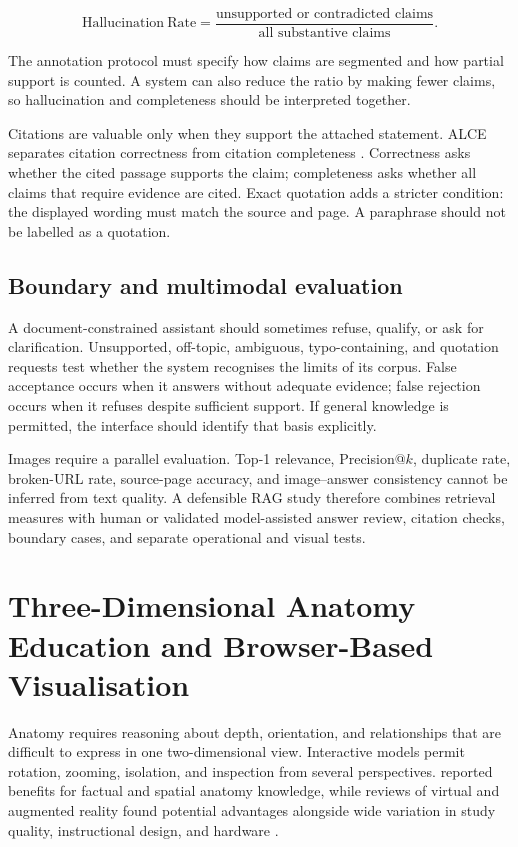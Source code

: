 \begin{equation}
\mathrm{Hallucination\ Rate}=
\frac{\text{unsupported or contradicted claims}}
{\text{all substantive claims}}.
\label{eq:hallucination-rate}
\end{equation}

The annotation protocol must specify how claims are segmented and how partial support is counted. A system can also reduce the ratio by making fewer claims, so hallucination and completeness should be interpreted together.

Citations are valuable only when they support the attached statement. ALCE separates citation correctness from citation completeness \parencite{gao2023alce}. Correctness asks whether the cited passage supports the claim; completeness asks whether all claims that require evidence are cited. Exact quotation adds a stricter condition: the displayed wording must match the source and page. A paraphrase should not be labelled as a quotation.

\subsection{Boundary and multimodal evaluation}

A document-constrained assistant should sometimes refuse, qualify, or ask for clarification. Unsupported, off-topic, ambiguous, typo-containing, and quotation requests test whether the system recognises the limits of its corpus. False acceptance occurs when it answers without adequate evidence; false rejection occurs when it refuses despite sufficient support. If general knowledge is permitted, the interface should identify that basis explicitly.

Images require a parallel evaluation. Top-1 relevance, Precision@$k$, duplicate rate, broken-URL rate, source-page accuracy, and image--answer consistency cannot be inferred from text quality. A defensible RAG study therefore combines retrieval measures with human or validated model-assisted answer review, citation checks, boundary cases, and separate operational and visual tests.

\section{Three-Dimensional Anatomy Education and Browser-Based Visualisation}
\label{sec:3d-anatomy-education}

Anatomy requires reasoning about depth, orientation, and relationships that are difficult to express in one two-dimensional view. Interactive models permit rotation, zooming, isolation, and inspection from several perspectives. \textcite{yammine2015} reported benefits for factual and spatial anatomy knowledge, while reviews of virtual and augmented reality found potential advantages alongside wide variation in study quality, instructional design, and hardware \parencite{moro2017,garciarobles2024}.

